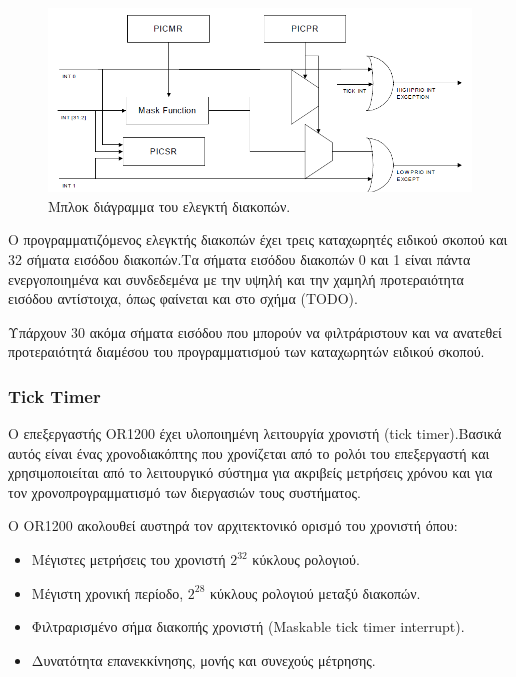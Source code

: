 \documentclass[a4paper,10pt]{article}
\numberwithin{figure}{subsection}
\numberwithin{table}{subsection}
\begin{document}
{\vspace{0.7cm}
\begin{figure}[h!]
 \centering
 \includegraphics[bb=0 0 845 367,scale=0.38]{./Images/inter_controller.png}
 \caption{Μπλοκ διάγραμμα του ελεγκτή διακοπών.}
\end{figure}
\vspace{0.7cm}


Ο προγραμματιζόμενος ελεγκτής διακοπών έχει τρεις καταχωρητές ειδικού σκοπού και 32 
σήματα εισόδου διακοπών.Τα σήματα εισόδου διακοπών 0 και 1 είναι πάντα ενεργοποιημένα και συνδεδεμένα 
με την υψηλή και την χαμηλή προτεραιότητα εισόδου ​​αντίστοιχα, όπως φαίνεται και στο σχήμα (TODO).
\newline

Υπάρχουν 30 ακόμα σήματα εισόδου που μπορούν να φιλτράριστουν και να ανατεθεί προτεραιότητά 
διαμέσου του προγραμματισμού των καταχωρητών ειδικού σκοπού.

\subsubsection{Tick Timer}

O επεξεργαστής OR1200 έχει υλοποιημένη λειτουργία χρονιστή (tick timer).Βασικά αυτός είναι
ένας χρονοδιακόπτης που χρονίζεται από το ρολόι του επεξεργαστή και χρησιμοποιείται από το
λειτουργικό σύστημα για ακριβείς μετρήσεις χρόνου και για τον χρονοπρογραμματισμό των διεργασιών τους
συστήματος.
\newline

Ο OR1200 ακολουθεί αυστηρά τον αρχιτεκτονικό ορισμό του χρονιστή όπου:

\begin{itemize}
 \item Μέγιστες μετρήσεις του χρονιστή $2^{32}$ κύκλους ρολογιού.
 \item Μέγιστη χρονική περίοδο, $2^{28}$ κύκλους ρολογιού μεταξύ διακοπών.
 \item Φιλτραρισμένο σήμα διακοπής χρονιστή (Maskable tick timer interrupt).
 \item Δυνατότητα επανεκκίνησης, μονής και συνεχούς μέτρησης.
\end{itemize}


}
\end{document}
